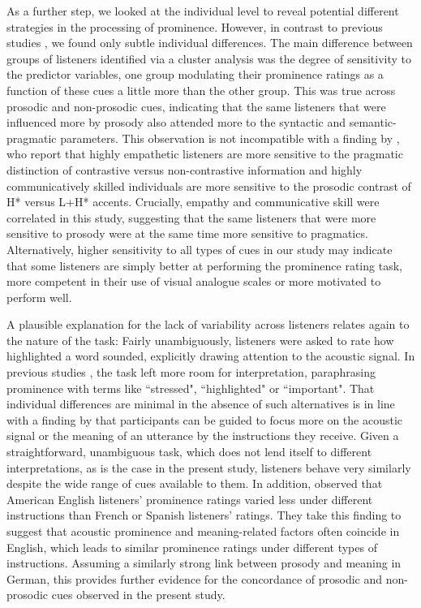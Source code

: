As a further step, we looked at the individual level to reveal potential different strategies in the processing of prominence. However, in contrast to previous studies \citep[e.g.,][]{cangemiListenerSpecificPerceptionSpeakerSpecific2015, bishopIndividualDifferencesTopdown2016, royIndividualDifferencesPatterns2017, baumannWhatMakesWord2018}, we found only subtle individual differences. The main difference between groups of listeners identified via a cluster analysis was the degree of sensitivity to the predictor variables, one group modulating their prominence ratings as a function of these cues a little more than the other group. This was true across prosodic and non-prosodic cues, indicating that the same listeners that were influenced more by prosody also attended more to the syntactic and semantic-pragmatic parameters. This observation is not incompatible with a finding by \citet{orricoInfluenceEmpathyAutisticlike2023}, who report that highly empathetic listeners are more sensitive to the pragmatic distinction of contrastive versus non-contrastive information and highly communicatively skilled individuals are more sensitive to the prosodic contrast of H* versus L+H* accents. Crucially, empathy and communicative skill were correlated in this study, suggesting that the same listeners that were more sensitive to prosody were at the same time more sensitive to pragmatics. Alternatively, higher sensitivity to all types of cues in our study may indicate that some listeners are simply better at performing the prominence rating task, more competent in their use of visual analogue scales or more motivated to perform well.

A plausible explanation for the lack of variability across listeners relates again to the nature of the task: Fairly unambiguously, listeners were asked to rate how highlighted a word sounded, explicitly drawing attention to the acoustic signal. In previous studies \citep[e.g.,][]{baumannWhatMakesWord2018}, the task left more room for interpretation, paraphrasing prominence with terms like ``stressed", ``highlighted" or ``important". That individual differences are minimal in the absence of such alternatives is in line with a finding by \citet{coleSoundStructureMeaning2019} that participants can be guided to focus more on the acoustic signal or the meaning of an utterance by the instructions they receive. Given a straightforward, unambiguous task, which does not lend itself to different interpretations, as is the case in the present study, listeners behave very similarly despite the wide range of cues available to them. In addition, \citet{coleSoundStructureMeaning2019} observed that American English listeners' prominence ratings varied less under different instructions than French or Spanish listeners' ratings. They take this finding to suggest that acoustic prominence and meaning-related factors often coincide in English, which leads to similar prominence ratings under different types of instructions. Assuming a similarly strong link between prosody and meaning in German, this provides further evidence for the concordance of prosodic and non-prosodic cues observed in the present study.

